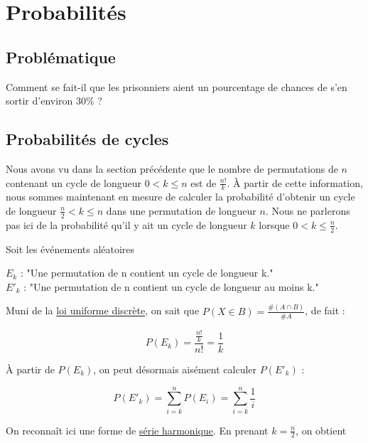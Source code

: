 \section{Probabilités}
\subsection{Problématique}

	Comment se fait-il que les prisonniers aient un pourcentage de chances de s'en sortir d'environ 30\% ? \\

\subsection{Probabilités de cycles}

	Nous avons vu dans la section précédente que le nombre de permutations de $n$ contenant un cycle de longueur $0 < k \leq n$ est de $\frac{n!}{k}$.
	À partir de cette information, nous sommes maintenant en mesure de calculer la probabilité d'obtenir un cycle de longueur $\frac{n}{2} < k \leq n$ dans une permutation de longueur $n$.
	Nous ne parlerons pas ici de la probabilité qu'il y ait un cycle de longueur $k$ lorsque $0 < k \leq \frac{n}{2}$.

	Soit les événements aléatoires
	\begin{center}
		$E_k$ : "Une permutation de n contient un cycle de longueur k." \\
		$E'_k$ : "Une permutation de n contient un cycle de longueur au moins k."
	\end{center}

	Muni de la \href{https://fr.wikipedia.org/wiki/Loi_uniforme_discr%C3%A8te#Calcul_d'une_probabilit%C3%A9}{loi uniforme discrète}, on sait que $P(X \in B) = \frac{\#(A \cap B)}{\#A}$, de fait :

	\begin{equation}
		P(E_k) = \frac{\frac{n!}{k}}{n!} = \frac{1}{k}
	\end{equation}

	À partir de $P(E_k)$, on peut désormais aisément calculer $P(E'_k)$ :

	\begin{equation}
		P(E'_k) = \sum_{i = k}^{n} P(E_i) = \sum_{i = k}^{n} \frac{1}{i}
	\end{equation}

	On reconnaît ici une forme de \href{https://en.wikipedia.org/wiki/Harmonic_series_(mathematics)#}{série harmonique}.
	En prenant $k = \frac{n}{2}$, on obtient

